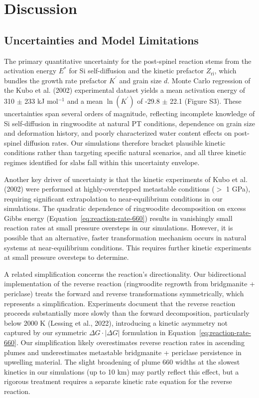 \documentclass[draft,linenumbers]{agujournal2019}
\begin{document}
\section{Discussion}\label{sec:discussion}

\subsection{Uncertainties and Model
Limitations}\label{sec:uncertainties-and-model-limitations}

The primary quantitative uncertainty for the post-spinel reaction stems
from the activation energy \(E^{\ast}\) for Si self-diffusion and the
kinetic prefactor \(Z_\mathrm{ri}\), which bundles the growth rate
prefactor \(K^{\prime}\) and grain size \(d\). Monte Carlo regression of
the Kubo et al. (2002) experimental dataset yields a mean activation
energy of 310 \(\pm\) 233 kJ mol\(^{-1}\) and a mean \(\ln(K^{\prime})\)
of -29.8 \(\pm\) 22.1 (Figure S3). These uncertainties span several
orders of magnitude, reflecting incomplete knowledge of Si
self-diffusion in ringwoodite at natural PT conditions, dependence on
grain size and deformation history, and poorly characterized water
content effects on post-spinel diffusion rates. Our simulations
therefore bracket plausible kinetic conditions rather than targeting
specific natural scenarios, and all three kinetic regimes identified for
slabs fall within this uncertainty envelope.

Another key driver of uncertainty is that the kinetic experiments of
Kubo et al. (2002) were performed at highly-overstepped metastable
conditions (\(>\) 1 GPa), requiring significant extrapolation to
near-equilibrium conditions in our simulations. The quadratic dependence
of ringwoodite decomposition on excess Gibbs energy
(Equation~\ref{eq:reaction-rate-660}) results in vanishingly small
reaction rates at small pressure oversteps in our simulations. However,
it is possible that an alternative, faster transformation mechanism
occurs in natural systems at near-equilibrium conditions. This requires
further kinetic experiments at small pressure oversteps to determine.

A related simplification concerns the reaction's directionality. Our
bidirectional implementation of the reverse reaction (ringwoodite
regrowth from bridgmanite + periclase) treats the forward and reverse
transformations symmetrically, which represents a simplification.
Experiments document that the reverse reaction proceeds substantially
more slowly than the forward decomposition, particularly below 2000 K
(Lessing et al., 2022), introducing a kinetic asymmetry not captured by
our symmetric \(\Delta G \cdot |\Delta G|\) formulation in
Equation~\ref{eq:reaction-rate-660}. Our simplification likely
overestimates reverse reaction rates in ascending plumes and
underestimates metastable bridgmanite + periclase persistence in
upwelling material. The slight broadening of plume 660 widths at the
slowest kinetics in our simulations (up to 10 km) may partly reflect
this effect, but a rigorous treatment requires a separate kinetic rate
equation for the reverse reaction.
\end{document}
